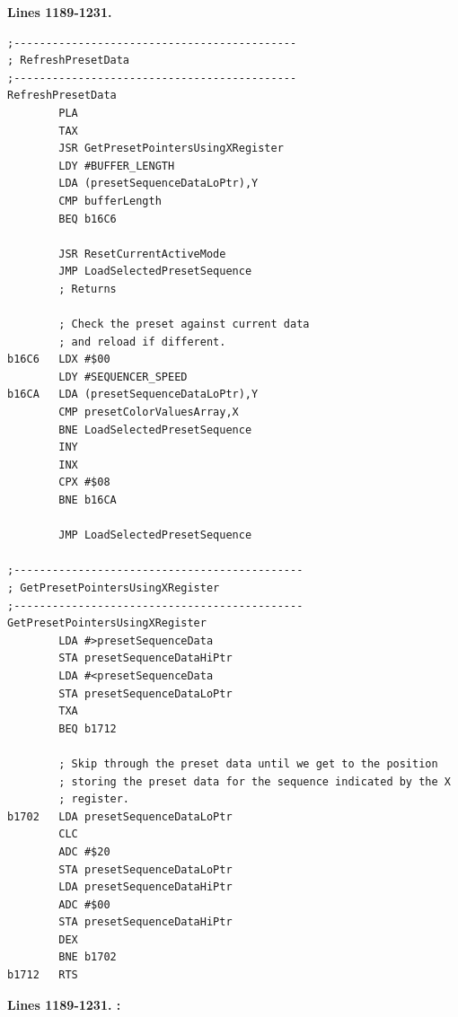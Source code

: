 \clearpage
\textbf{Lines 1189-1231. } 
\begin{lstlisting}[basicstyle=\ttfamily\scriptsize]
;--------------------------------------------
; RefreshPresetData
;--------------------------------------------
RefreshPresetData    
        PLA 
        TAX 
        JSR GetPresetPointersUsingXRegister
        LDY #BUFFER_LENGTH
        LDA (presetSequenceDataLoPtr),Y
        CMP bufferLength
        BEQ b16C6

        JSR ResetCurrentActiveMode
        JMP LoadSelectedPresetSequence
        ; Returns

        ; Check the preset against current data
        ; and reload if different.
b16C6   LDX #$00
        LDY #SEQUENCER_SPEED
b16CA   LDA (presetSequenceDataLoPtr),Y
        CMP presetColorValuesArray,X
        BNE LoadSelectedPresetSequence
        INY 
        INX 
        CPX #$08
        BNE b16CA

        JMP LoadSelectedPresetSequence

;---------------------------------------------
; GetPresetPointersUsingXRegister
;---------------------------------------------
GetPresetPointersUsingXRegister   
        LDA #>presetSequenceData
        STA presetSequenceDataHiPtr
        LDA #<presetSequenceData
        STA presetSequenceDataLoPtr
        TXA 
        BEQ b1712

        ; Skip through the preset data until we get to the position
        ; storing the preset data for the sequence indicated by the X
        ; register.
b1702   LDA presetSequenceDataLoPtr
        CLC 
        ADC #$20
        STA presetSequenceDataLoPtr
        LDA presetSequenceDataHiPtr
        ADC #$00
        STA presetSequenceDataHiPtr
        DEX 
        BNE b1702
b1712   RTS 

\end{lstlisting}
\clearpage

\textbf{Lines 1189-1231. :} 
\clearpage

